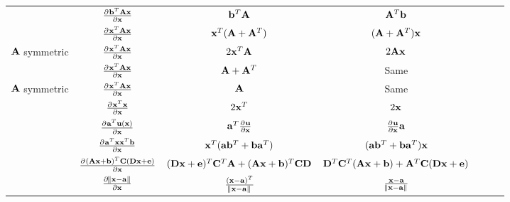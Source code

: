\begin{center}
\begin{tabular}{l|Sc|Sc|Sc}
                           & $\pd{\vb^T\mA\vx}{\vx}$                       & $\vb^T\mA$                                         & $\mA^T\vb$                                    \\
                           & $\pd{\vx^T\mA\vx}{\vx}$                       & $\vx^T(\mA+\mA^T)$                                 & $(\mA+\mA^T)\vx$                              \\
$\mA$ symmetric            & $\pd{\vx^T\mA\vx}{\vx}$                       & $2\vx^T\mA$                                        & $2\mA\vx$                                     \\
                           & $\pd{\vx^T\mA\vx}{\vx}$                       & $\mA+\mA^T$                                        & Same                                          \\
$\mA$ symmetric            & $\pd{\vx^T\mA\vx}{\vx}$                       & $\mA$                                              & Same                                          \\
                           & $\pd{\vx^T\vx}{\vx}$                          & $2\vx^T$                                           & $2\vx$                                        \\
                           & $\pd{\va^T\vu(\vx)}{\vx}$                     & $\va^T\pd{\vu}{\vx}$                               & $\pd{\vu}{\vx}\va$                            \\
                           & $\pd{\va^T\vx\vx^T\vb}{\vx}$                  & $\vx^T(\va\vb^T+\vb\va^T)$                         & $(\va\vb^T+\vb\va^T)\vx$                      \\
                           & $\pd{(\mA\vx+\vb)^T\mC(\mD\vx+\ve)}{\vx}$     & $(\mD\vx+\ve)^T\mC^T\mA+(\mA\vx+\vb)^T\mC\mD$      & $\mD^T\mC^T(\mA\vx+\vb)+\mA^T\mC(\mD\vx+\ve)$ \\
                           & $\pd{\norm{\vx-\va}}{\vx}$                    & $\frac{(\vx-\va)^T}{\norm{\vx-\va}}$               & $\frac{\vx-\va}{\norm{\vx-\va}}$              \\                           
\end{tabular}
\end{center}

